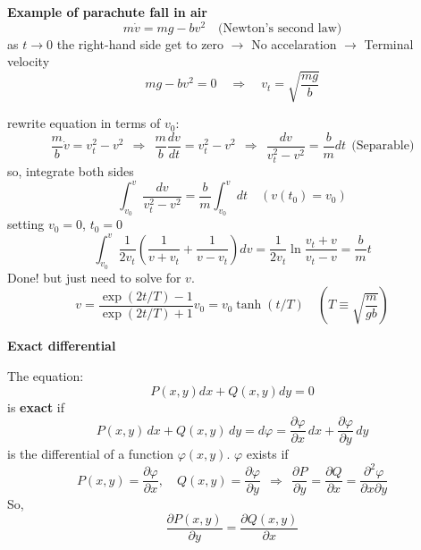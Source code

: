 \documentclass{article}
\begin{document}
\vspace{2mm}\noindent
\textbf{Example of parachute fall in air}
\begin{equation}
    m \dot{v} = mg - bv^2 \quad \text{(Newton's second law)} 
\end{equation}
as $t\rightarrow 0$ the right-hand side get to zero $\rightarrow$ No accelaration $\rightarrow$ Terminal velocity
\begin{equation}
    mg-bv^2 = 0 \quad \Rightarrow \quad v_t = \sqrt{\frac{mg}{b}}
\end{equation}

\newpage

\noindent
rewrite equation in terms of $v_0$:
\begin{equation}
    \frac{m}{b} \dot{v} = v_t ^ 2 - v^2 \ \ \Rightarrow \ \ \frac{m}{b} \frac{dv}{dt} = v_t ^ 2 - v^2 \ \ \Rightarrow \ \ \boxed{ \frac{dv}{v_t ^ 2 - v^2} = \frac{b}{m} dt } \ \ \text{(Separable)}
\end{equation}
so, integrate both sides
\begin{equation}
    \int_{v_0}^{v} \frac{dv}{v_t ^ 2 - v^2} = \frac{b}{m} \int_{v_0}^{v} dt \quad (v(t_0) = v_0 )
\end{equation}
setting $v_0 = 0$, $t_0 = 0$
\begin{equation}
    \int_{v_0}^{v} \frac{1}{2v_t} \left( \frac{1}{v + v_t} + \frac{1}{v - v_t} \right) dv = \frac{1}{2v_t} \ln \frac{v_t + v}{v_t - v}  = \frac{b}{m} t
\end{equation}
Done! but just need to solve for $v$.
\begin{equation}
    v = \frac{\exp{(2t/T)} - 1}{\exp{(2t/T)} + 1} v_0 = v_0 \tanh{(t/T)} \quad \left( T \equiv \sqrt{\frac{m}{gb}} \right)
\end{equation}

\vspace{2mm}\noindent
\textbf{Exact differential}

\noindent
The equation:
\begin{equation}
    P(x,y)dx + Q(x, y) dy = 0
\end{equation}
is \textbf{exact} if
\begin{equation}
    P(x, y)\,dx + Q(x, y)\,dy = d\varphi = \frac{\partial \varphi}{\partial x}\,dx + \frac{\partial \varphi}{\partial y}\,dy
\end{equation}
is the differential of a function $\varphi(x, y)$. $\varphi$ exists if
\begin{equation}
    P(x, y) = \frac{\partial \varphi}{\partial x}, \quad 
Q(x, y) = \frac{\partial \varphi}{\partial y} \ \ 
\Rightarrow \ \
\frac{\partial P}{\partial y} = \frac{\partial Q}{\partial x} 
= \frac{\partial^2 \varphi}{\partial x \partial y}
\end{equation}
So,
\begin{equation}
   \boxed{ \frac{\partial P(x, y)}{\partial y} = \frac{\partial Q(x, y)}{\partial x} }
\end{equation}
\end{document}
